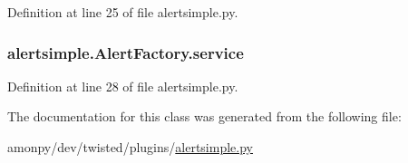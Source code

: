 Definition at line 25 of file alertsimple.\-py.

\hypertarget{classalertsimple_1_1_alert_factory_ad63601528dbc68ada0dbbd9078e39205}{
\subsubsection[{service}]{\setlength{\rightskip}{0pt plus 5cm}alertsimple.\-Alert\-Factory.\-service}}\label{classalertsimple_1_1_alert_factory_ad63601528dbc68ada0dbbd9078e39205}


Definition at line 28 of file alertsimple.\-py.



The documentation for this class was generated from the following file\-:\begin{DoxyCompactItemize}
\item 
amonpy/dev/twisted/plugins/\hyperlink{alertsimple_8py}{alertsimple.\-py}\end{DoxyCompactItemize}
